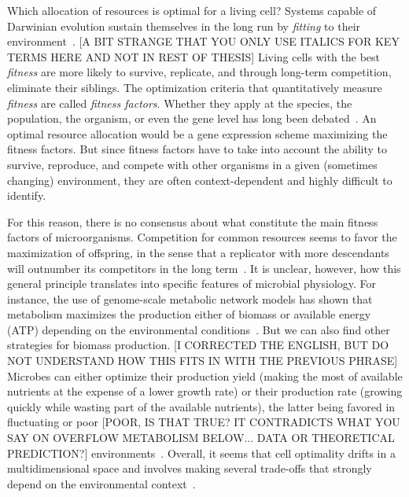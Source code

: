 Which allocation of resources is optimal for a living cell?
Systems capable of Darwinian evolution sustain themselves in the long run by \textit{fitting} to their environment~\cite{dawkins_selfish_1976}. [A BIT STRANGE THAT YOU ONLY USE ITALICS FOR KEY TERMS HERE AND NOT IN REST OF THESIS]
Living cells with the best \textit{fitness} are more likely to survive, replicate, and through long-term competition, eliminate their siblings.
The optimization criteria that quantitatively measure \textit{fitness} are called \textit{fitness factors}.
Whether they apply at the species, the population, the organism, or even the gene level has long been debated~\cite{dawkins_selfish_1976}.
An optimal resource allocation would be a gene expression scheme maximizing the fitness factors.
But since fitness factors have to take into account the ability to survive, reproduce, and compete with other organisms in a given (sometimes changing) environment, they are often context-dependent and highly difficult to identify.

For this reason, there is no consensus about what constitute the main fitness factors of microorganisms.
Competition for common resources seems to favor the maximization of offspring, in the sense that a replicator with more descendants will outnumber its competitors in the long term~\cite{dawkins_selfish_1976}.
It is unclear, however, how this general principle translates into specific features of microbial physiology.
For instance, the use of genome-scale metabolic network models has shown that metabolism maximizes the production either of biomass or available energy (ATP) depending on the environmental conditions~\cite{schuetz_systematic_2007}.
But we can also find other strategies for biomass production. [I CORRECTED THE ENGLISH, BUT DO NOT UNDERSTAND HOW THIS FITS IN WITH THE PREVIOUS PHRASE]
Microbes can either optimize their production yield (making the most of available nutrients at the expense of a lower growth rate) or their production rate (growing quickly while wasting part of the available nutrients), the latter being favored in fluctuating or poor [POOR, IS THAT TRUE? IT CONTRADICTS WHAT YOU SAY ON OVERFLOW METABOLISM BELOW... DATA OR THEORETICAL PREDICTION?] environments~\cite{frank_tradeoff_2010,maclean_tragedy_2008,schuster_maximization_2008}.
Overall, it seems that cell optimality drifts in a multidimensional space and involves making several trade-offs that strongly depend on the environmental context~\cite{schuetz_multidimensional_2012}.

